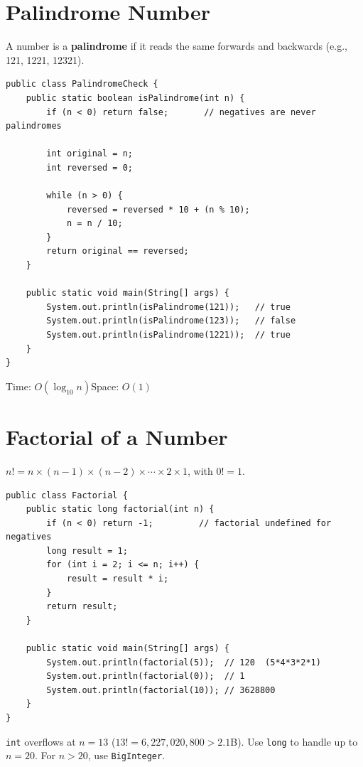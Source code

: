 \documentclass[12pt,a4paper,oneside]{book}
\begin{document}
\section{Palindrome Number}

A number is a \textbf{palindrome} if it reads the same forwards and backwards (e.g., 121, 1221, 12321).

\begin{lstlisting}[caption={Check Palindrome Number}]
public class PalindromeCheck {
    public static boolean isPalindrome(int n) {
        if (n < 0) return false;       // negatives are never palindromes

        int original = n;
        int reversed = 0;

        while (n > 0) {
            reversed = reversed * 10 + (n % 10);
            n = n / 10;
        }
        return original == reversed;
    }

    public static void main(String[] args) {
        System.out.println(isPalindrome(121));   // true
        System.out.println(isPalindrome(123));   // false
        System.out.println(isPalindrome(1221));  // true
    }
}
\end{lstlisting}

\begin{complexity}
Time: $O(\log_{10} n)$\quad Space: $O(1)$
\end{complexity}

\section{Factorial of a Number}

$n! = n \times (n-1) \times (n-2) \times \cdots \times 2 \times 1$, with $0! = 1$.

\begin{lstlisting}[caption={Factorial --- Iterative approach}]
public class Factorial {
    public static long factorial(int n) {
        if (n < 0) return -1;         // factorial undefined for negatives
        long result = 1;
        for (int i = 2; i <= n; i++) {
            result = result * i;
        }
        return result;
    }

    public static void main(String[] args) {
        System.out.println(factorial(5));  // 120  (5*4*3*2*1)
        System.out.println(factorial(0));  // 1
        System.out.println(factorial(10)); // 3628800
    }
}
\end{lstlisting}

\begin{tipbox}
\texttt{int} overflows at $n = 13$ ($13! = 6{,}227{,}020{,}800 > 2.1$B). Use \texttt{long} to handle up to $n = 20$. For $n > 20$, use \texttt{BigInteger}.
\end{tipbox}
\end{document}
